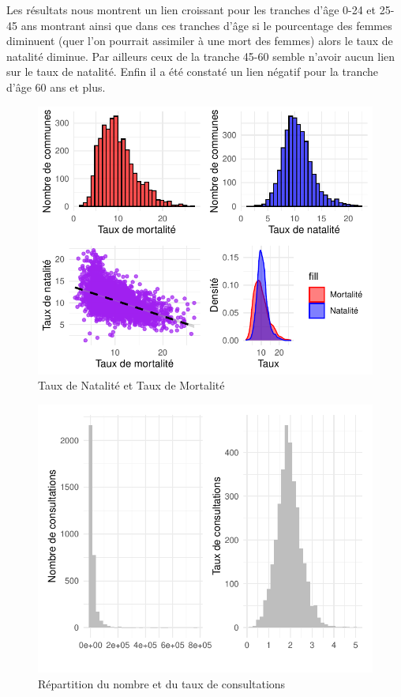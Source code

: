 \documentclass[
]{article}
\begin{document}
Les résultats nous montrent un lien croissant pour les tranches d'âge
0-24 et 25-45 ans montrant ainsi que dans ces tranches d'âge si le
pourcentage des femmes diminuent (quer l'on pourrait assimiler à une
mort des femmes) alors le taux de natalité diminue. Par ailleurs ceux de
la tranche 45-60 semble n'avoir aucun lien sur le taux de natalité.
Enfin il a été constaté un lien négatif pour la tranche d'âge 60 ans et
plus.

\begin{figure}

{\centering \includegraphics{rapport_intermediaire_files/figure-latex/unnamed-chunk-19-1} 

}

\caption{Taux de Natalité et Taux de Mortalité}\label{fig:unnamed-chunk-19}
\end{figure}

\begin{figure}

{\centering \includegraphics{rapport_intermediaire_files/figure-latex/unnamed-chunk-20-1} 

}

\caption{Répartition du nombre et du taux de consultations}\label{fig:unnamed-chunk-20}
\end{figure}
\end{document}

